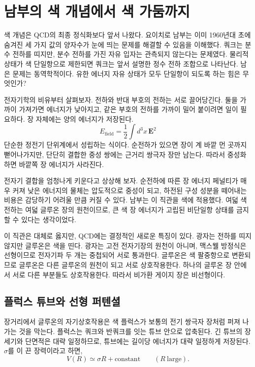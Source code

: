\section{남부의 색 개념에서 색 가둠까지}

색 개념은 QCD의 최종 정식화보다 앞서 나왔다. 요이치로 남부는 이미 1960년대 초에 숨겨진 세 가지 값의 양자수가 눈에 띄는 문제를 해결할 수 있음을 이해했다. 쿼크는 분수 전하를 띠지만, 분수 전하를 가진 자유 입자는 관측되지 않는다는 문제였다. 물리적 상태가 색 단일항으로 제한되면 쿼크는 앞서 설명한 정수 전하 조합으로 나타난다. 남은 문제는 동역학적이다. 유한 에너지 자유 상태가 모두 단일항이 되도록 하는 힘은 무엇인가?

전자기학의 비유부터 살펴보자. 전하와 반대 부호의 전하는 서로 끌어당긴다. 둘을 가까이 가져가면 에너지가 낮아지고, 같은 부호의 전하를 가까이 밀어 붙이려면 일이 필요하다. 장 자체에는 양의 에너지가 저장된다.
\begin{equation}
E_{\mathrm{field}}
=\frac12\int d^3x\,\boldsymbol E^2
\end{equation}
단순한 정전기 단위계에서 성립하는 식이다. 순전하가 있으면 장이 계 바깥 먼 곳까지 뻗어나가지만, 단단히 결합한 중성 쌍에는 근거리 쌍극자 장만 남는다. 따라서 중성화하면 바깥쪽 장 에너지가 사라진다.

전자기 결합을 엄청나게 키운다고 상상해 보자. 순전하에 따른 장 에너지 페널티가 매우 커져 낮은 에너지의 물체는 압도적으로 중성이 되고, 하전된 구성 성분을 떼어내는 비용은 감당하기 어려울 만큼 커질 수 있다. 남부는 이 직관을 색에 적용했다. 여덟 색 전하는 여덟 글루온 장의 원천이므로, 큰 색 장 에너지가 고립된 비단일항 상태를 금지할 수 있다는 생각이었다.

이 직관은 대체로 옳지만, QCD에는 결정적인 새로운 특징이 있다. 광자는 전하를 띠지 않지만 글루온은 색을 띤다. 광자는 고전 전자기장의 원천이 아니며, 맥스웰 방정식은 선형이므로 전자기파 두 개는 중첩되어 서로 통과한다. 글루온은 색 팔중항으로 변환되므로 글루온은 다른 글루온의 원천이 되고 서로 상호작용한다. 하나의 글루온 장 안에서 서로 다른 부분들도 상호작용한다. 따라서 비가환 게이지 장은 비선형이다.

\subsection{플럭스 튜브와 선형 퍼텐셜}

장거리에서 글루온의 자기상호작용은 색 플럭스가 보통의 전기 쌍극자 장처럼 퍼져 나가는 것을 막는다. 플럭스는 쿼크와 반쿼크를 잇는 튜브 안으로 압축된다. 긴 튜브의 장 세기와 단면적은 대략 일정하므로, 튜브에는 길이당 에너지가 대략 일정하게 저장된다. \(\sigma\)를 이 끈 장력이라고 하면,
\begin{equation}
V(R)\simeq\sigma R+\text{constant}
\qquad (R\ \text{large}).
\label{eq:l4-linear-potential}
\end{equation}

